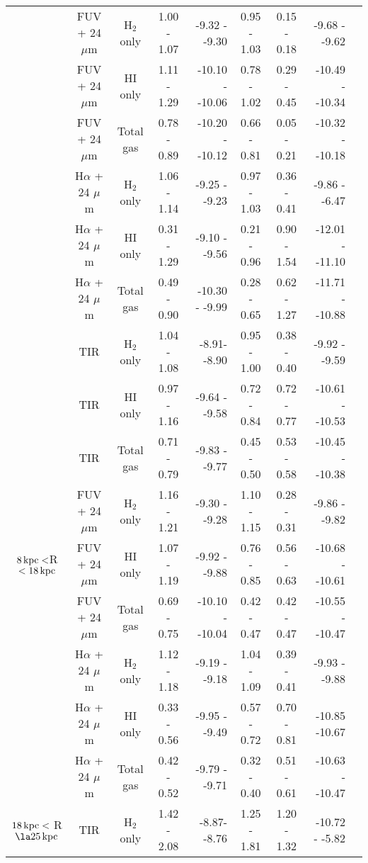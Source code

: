 \documentclass[useAMS,usenatbib]{mn2e}
\newcommand \kpc        {\,{\rm kpc}}
\begin{document}
\begin{table*}
\begin{tabular}{ccccrccrr}
 & FUV + 24 $\mu$m       & H$_2$ only & 1.00 - 1.07 & -9.32 - -9.30  & 0.95 - 1.03  & 0.15 - 0.18  & -9.68 - -9.62      \\
 & FUV + 24 $\mu$m       & HI only    & 1.11 - 1.29 & -10.10 - -10.06 & 0.78 - 1.02    & 0.29 - 0.45   & -10.49 - -10.34     \\
 & FUV + 24 $\mu$m       & Total gas  & 0.78 - 0.89 &-10.20 - -10.12 & 0.66 - 0.81    & 0.05 - 0.21    & -10.32 - -10.18      \\
 & H$\alpha$ + 24 $\mu$m & H$_2$ only & 1.06 - 1.14 & -9.25 - -9.23  & 0.97 - 1.03    & 0.36 - 0.41    & -9.86 - -6.47      \\
 & H$\alpha$ + 24 $\mu$m & HI only    & 0.31 - 1.29 & -9.10 - -9.56  & 0.21 - 0.96    & 0.90 - 1.54    & -12.01 - -11.10     \\
 & H$\alpha$ + 24 $\mu$m & Total gas  & 0.49 - 0.90 & -10.30 - -9.99  & 0.28 - 0.65    & 0.62 - 1.27    & -11.71 - -10.88    \\
\hline
\multicolumn{1}{c}{\multirow{9}{*}{$8\kpc < $R $< 18\kpc$}} & TIR & H$_2$ only & 1.04 - 1.08 & -8.91- -8.90 & 0.95 - 1.00 & 0.38 - 0.40 & -9.92 - -9.59 \\
 & TIR               & HI only    & 0.97 - 1.16 & -9.64 - -9.58  & 0.72 - 0.84    & 0.72 - 0.77    & -10.61 - -10.53     \\
 & TIR               & Total gas  & 0.71 - 0.79 & -9.83 - -9.77  & 0.45 - 0.50    & 0.53 - 0.58    & -10.45 - -10.38     \\
 & FUV + 24 $\mu$m       & H$_2$ only & 1.16 - 1.21 & -9.30 - -9.28  & 1.10 - 1.15    & 0.28 - 0.31    & -9.86 - -9.82      \\
 & FUV + 24 $\mu$m       & HI only    & 1.07 - 1.19 & -9.92 - -9.88  & 0.76 - 0.85    & 0.56 - 0.63    & -10.68 - -10.61     \\
 & FUV + 24 $\mu$m       & Total gas  & 0.69 - 0.75 & -10.10 - -10.04 & 0.42 - 0.47    & 0.42 - 0.47    & -10.55 - -10.47     \\
 & H$\alpha$ + 24 $\mu$m & H$_2$ only & 1.12 - 1.18 & -9.19 - -9.18  & 1.04 - 1.09    & 0.39 - 0.41    & -9.93 - -9.88      \\
 & H$\alpha$ + 24 $\mu$m & HI only    & 0.33 - 0.56 & -9.95 - -9.49  & 0.57 - 0.72    & 0.70 - 0.81    & -10.85 -10.67     \\
 & H$\alpha$ + 24 $\mu$m & Total gas  & 0.42 - 0.52 & -9.79 - -9.71  & 0.32 - 0.40    & 0.51 - 0.61    & -10.63 - -10.47  \\
\hline
\multicolumn{1}{c}{\multirow{9}{*}{$18\kpc <$ R $\la 25\kpc$}} & TIR & H$_2$ only & 1.42 - 2.08 &-8.87- -8.76 & 1.25 - 1.81& 1.20 - 1.32& -10.72 - -5.82 \\

\end{tabular}
\end{table*}
\end{document}
